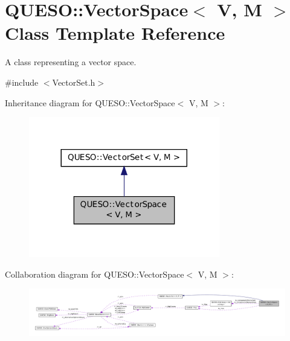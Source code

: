 \hypertarget{class_q_u_e_s_o_1_1_vector_space}{\section{Q\-U\-E\-S\-O\-:\-:Vector\-Space$<$ V, M $>$ Class Template Reference}
\label{class_q_u_e_s_o_1_1_vector_space}
}


A class representing a vector space.  




{\ttfamily \#include $<$Vector\-Set.\-h$>$}



Inheritance diagram for Q\-U\-E\-S\-O\-:\-:Vector\-Space$<$ V, M $>$\-:
\nopagebreak
\begin{figure}[H]
\begin{center}
\leavevmode
\includegraphics[width=236pt]{class_q_u_e_s_o_1_1_vector_space__inherit__graph}
\end{center}
\end{figure}


Collaboration diagram for Q\-U\-E\-S\-O\-:\-:Vector\-Space$<$ V, M $>$\-:
\nopagebreak
\begin{figure}[H]
\begin{center}
\leavevmode
\includegraphics[width=350pt]{class_q_u_e_s_o_1_1_vector_space__coll__graph}
\end{center}
\end{figure}
